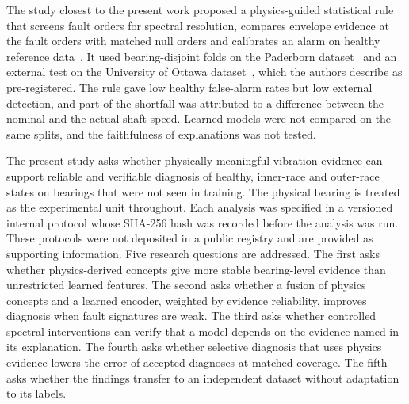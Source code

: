 \documentclass[10pt,letterpaper]{article}
\begin{document}
The study closest to the present work proposed a physics-guided statistical rule that screens fault orders for spectral resolution, compares envelope evidence at the fault orders with matched null orders and calibrates an alarm on healthy reference data~\cite{siddique2026physics}. It used bearing-disjoint folds on the Paderborn dataset~\cite{lessmeier2016condition} and an external test on the University of Ottawa dataset~\cite{sehri2023university}, which the authors describe as pre-registered. The rule gave low healthy false-alarm rates but low external detection, and part of the shortfall was attributed to a difference between the nominal and the actual shaft speed. Learned models were not compared on the same splits, and the faithfulness of explanations was not tested.

The present study asks whether physically meaningful vibration evidence can support reliable and verifiable diagnosis of healthy, inner-race and outer-race states on bearings that were not seen in training. The physical bearing is treated as the experimental unit throughout. Each analysis was specified in a versioned internal protocol whose SHA-256 hash was recorded before the analysis was run. These protocols were not deposited in a public registry and are provided as supporting information. Five research questions are addressed. The first asks whether physics-derived concepts give more stable bearing-level evidence than unrestricted learned features. The second asks whether a fusion of physics concepts and a learned encoder, weighted by evidence reliability, improves diagnosis when fault signatures are weak. The third asks whether controlled spectral interventions can verify that a model depends on the evidence named in its explanation. The fourth asks whether selective diagnosis that uses physics evidence lowers the error of accepted diagnoses at matched coverage. The fifth asks whether the findings transfer to an independent dataset without adaptation to its labels.
\end{document}
